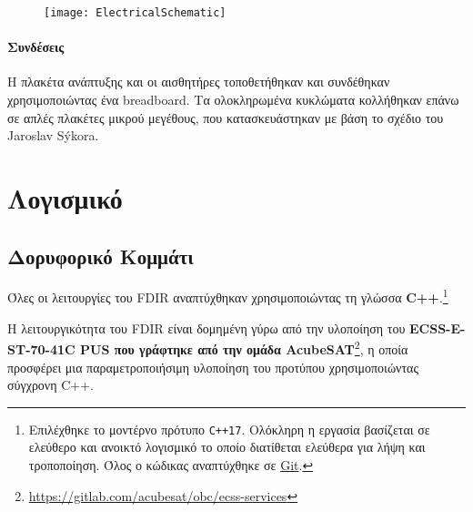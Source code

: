 \documentclass[a4paper,nobib]{tufte-book}
\begin{document}
\begin{figure}[h]
	\texttt{[image: ElectricalSchematic]}
	\label{fig:schematic}
\end{figure}

\paragraph{Συνδέσεις}
Η πλακέτα ανάπτυξης και οι αισθητήρες τοποθετήθηκαν και συνδέθηκαν χρησιμοποιώντας ένα breadboard. Τα ολοκληρωμένα κυκλώματα κολλήθηκαν επάνω σε απλές πλακέτες μικρού μεγέθους, που κατασκευάστηκαν με βάση το σχέδιο του Jaroslav Sýkora.

\section{Λογισμικό}

\subsection{Δορυφορικό Κομμάτι}

Όλες οι λειτουργίες του \ac{FDIR} αναπτύχθηκαν χρησιμοποιώντας τη γλώσσα \textbf{C++}.\footnote{Επιλέχθηκε το μοντέρνο πρότυπο \texttt{C++17}. Ολόκληρη η εργασία βασίζεται σε ελεύθερο και ανοικτό λογισμικό το οποίο διατίθεται ελεύθερα για λήψη και τροποποίηση. Όλος ο κώδικας αναπτύχθηκε σε \href{https://git-scm.com/}{Git}.}
	
	Η λειτουργικότητα του \ac{FDIR} είναι δομημένη γύρω από την υλοποίηση του \textbf{ECSS-E-ST-70-41C \ac{PUS} που γράφτηκε από την ομάδα AcubeSAT}\footnote{\url{https://gitlab.com/acubesat/obc/ecss-services}}, η οποία προσφέρει μια παραμετροποιήσιμη υλοποίηση του προτύπου χρησιμοποιώντας σύγχρονη C++.
	
\end{document}
